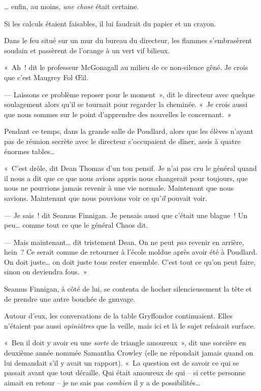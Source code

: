 … enfin, au moins, \emph{une chose} était certaine.

Si les calculs étaient faisables, il lui faudrait du papier et un crayon.

Dans le feu situé sur un mur du bureau du directeur, les flammes s'embrasèrent soudain et passèrent de l'orange à un vert vif bilieux.

«~Ah~! dit le professeur McGonagall au milieu de ce non-silence gêné. Je crois que c'est Maugrey Fol Œil.

--- Laissons ce problème reposer pour le moment~», dit le directeur avec quelque soulagement alors qu'il se tournait pour regarder la cheminée. «~Je crois aussi que nous sommes sur le point d'apprendre des nouvelles le concernant.~»


Pendant ce temps, dans la grande salle de Poudlard, alors que les élèves n'ayant pas de réunion secrète avec le directeur s'occupaient de dîner, assis à quatre énormes tables…

«~C'est drôle, dit Dean Thomas d'un ton pensif. Je n'ai pas cru le général quand il nous a dit que ce que nous avions appris nous changerait pour toujours, que nous ne pourrions jamais revenir à une vie normale. Maintenant que nous savions. Maintenant que nous pouvions voir ce qu'\emph{il} pouvait voir.

--- Je sais~! dit Seamus Finnigan. Je pensais aussi que c'était une blague~! Un peu… comme tout ce que le général Chaos dit.

--- Mais maintenant… dit tristement Dean. On ne peut \emph{pas} revenir en arrière, hein~? Ce serait comme de retourner à l'école moldue après avoir été à Poudlard. On doit juste… on doit juste tous rester ensemble. C'est tout ce qu'on peut faire, sinon on deviendra fous.~»

Seamus Finnigan, à côté de lui, se contenta de hocher silencieusement la tête et de prendre une autre bouchée de gnuvage.

Autour d'eux, les conversations de la table Gryffondor continuaient. Elles n'étaient pas aussi \emph{opiniâtres} que la veille, mais ici et là le sujet refaisait surface.

«~Ben il doit y avoir eu une \emph{sorte} de triangle amoureux~», dit une sorcière en deuxième année nommée Samantha Crowley (elle ne répondait jamais quand on lui demandait s'il y avait un rapport). «~La question est de savoir ce qui se passait avant que tout déraille. Qui était amoureux de qui -- si cette personne aimait en retour -- je ne sais pas \emph{combien} il y a de possibilités…

